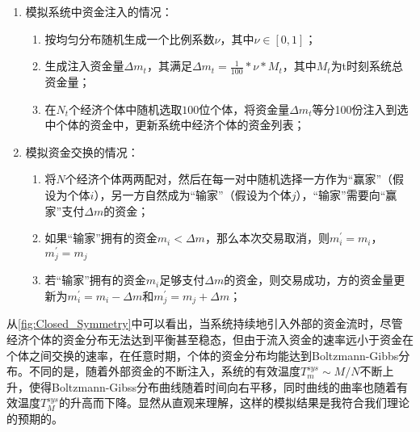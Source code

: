 \documentclass[tsinghuacite]{HustGraduPaper}
\begin{document}
			\begin{enumerate}
			
			\item 模拟系统中资金注入的情况：
			
				\begin{enumerate}[label=(\roman*)]
			
				\item 按均匀分布随机生成一个比例系数$\nu$，其中$\nu \in [0,1]$；
				
				\item 生成注入资金量$\Delta m_t$，其满足$\Delta m_t =  \frac{1}{100} * \nu * M_t $，其中$M_t$为t时刻系统总资金量；
				
				\item 在$N_t$个经济个体中随机选取$100$位个体，将资金量$\Delta m_t$等分100份注入到选中个体的资金中，更新系统中经济个体的资金列表；
				
				\end{enumerate}
			
			\item 模拟资金交换的情况：
			
				\begin{enumerate}[label=(\roman*)]
				
				\item 将$N$个经济个体两两配对，然后在每一对中随机选择一方作为“赢家”（假设为个体$i$），另一方自然成为“输家”（假设为个体$j$），“输家”需要向“赢家”支付$\Delta m$的资金；
				
				\item 如果“输家”拥有的资金$m_{i} < \Delta m$，那么本次交易取消，则$m_i^{'} = m_i$，$m_j^{'} = m_j$
								
				\item 若“输家”拥有的资金$m_i$足够支付$\Delta m$的资金，则交易成功，方的资金量更新为$m_i^{'} = m_i - \Delta m$和$m_j^{'} = m_j + \Delta m$；
				
				\end{enumerate}
		
			\end{enumerate}
					
					
	
			从\autoref{fig:Closed_Symmetry}中可以看出，当系统持续地引入外部的资金流时，尽管经济个体的资金分布无法达到平衡甚至稳态，但由于流入资金的速率远小于资金在个体之间交换的速率，在任意时期，个体的资金分布均能达到Boltzmann-Gibbs分布。不同的是，随着外部资金的不断注入，系统的有效温度$T_m^{sys} \sim M/N $不断上升，使得Boltzmann-Gibss分布曲线随着时间向右平移，同时曲线的曲率也随着有效温度$T_M^{sys}$的升高而下降。显然从直观来理解，这样的模拟结果是我符合我们理论的预期的。
			
\end{document}
